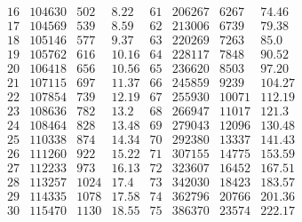 \documentclass[11pt,a4paper]{article}
\begin{document}
\[
\begin{array}{r|r|r|r||r|r|r|r}
16 & 104630 & 502 & 8.22 & 61 & 206267 & 6267 & 74.46 \\
17 & 104569 & 539 & 8.59 & 62 & 213006 & 6739 & 79.38 \\
18 & 105146 & 577 & 9.37 & 63 & 220269 & 7263 & 85.0 \\
19 & 105762 & 616 & 10.16 & 64 & 228117 & 7848 & 90.52 \\
20 & 106418 & 656 & 10.56 & 65 & 236620 & 8503 & 97.20 \\
\hline
21 & 107115 & 697 & 11.37 & 66 & 245859 & 9239 & 104.27 \\
22 & 107854 & 739 & 12.19 & 67 & 255930 & 10071 & 112.19 \\
23 & 108636 & 782 & 13.2 & 68 & 266947 & 11017 & 121.3 \\
24 & 108464 & 828 & 13.48 & 69 & 279043 & 12096 & 130.48 \\
25 & 110338 & 874 & 14.34 & 70 & 292380 & 13337 & 141.43 \\
\hline
26 & 111260 & 922 & 15.22 & 71 & 307155 & 14775 & 153.59 \\
27 & 112233 & 973 & 16.13 & 72 & 323607 & 16452 & 167.51 \\
28 & 113257 & 1024 & 17.4 & 73 & 342030 & 18423 & 183.57 \\
29 & 114335 & 1078 & 17.58 & 74 & 362796 & 20766 & 201.36 \\
30 & 115470 & 1130 & 18.55 & 75 & 386370 & 23574 & 222.17 \\
\end{array}
\]
\end{document}

